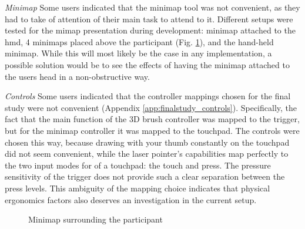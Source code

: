 \textit{Minimap} Some users indicated that the minimap tool was not convenient, as they had to take of attention of their main task to attend to it. Different setups were tested for the mimap presentation during development: minimap attached to the \gls{hmd}, 4 minimaps placed above the participant (Fig. \ref{fig:finalstudyminimaparound}), and the hand-held minimap. While this will most likely be the case in any implementation, a possible solution would be to see the effects of having the minimap attached to the users head in a non-obstructive way.

\textit{Controls} Some users indicated that the controller mappings chosen for the final study were not convenient (Appendix \ref{app:finalstudy_controls}). Specifically, the fact that the main function of the 3D brush controller was mapped to the trigger, but for the minimap controller it was mapped to the touchpad. The controls were chosen this way, because drawing with your thumb constantly on the touchpad did not seem convenient, while the laser pointer's capabilities map perfectly to the two input modes for of a touchpad: the touch and press. The pressure sensitivity of the trigger does not provide such a clear separation between the press levels. This ambiguity of the mapping choice indicates that physical ergonomics factors also deserves an investigation in the current setup.

\begin{figure}[h]
	\centering
	\caption{Minimap surrounding the participant}
	\label{fig:finalstudyminimaparound}
\end{figure}